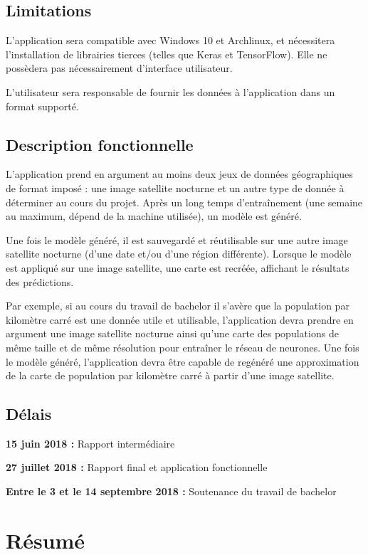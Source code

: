 \documentclass[a4paper]{report}
\begin{document}
\section{Limitations}
L'application sera compatible avec Windows 10 et Archlinux, et nécessitera l'installation de librairies tierces (telles que Keras et TensorFlow).
Elle ne possèdera pas nécessairement d'interface utilisateur.

L'utilisateur sera responsable de fournir les données à l'application dans un format supporté.

\section{Description fonctionnelle}
L'application prend en argument au moins deux jeux de données géographiques de format imposé : une image satellite nocturne et un autre type de donnée à déterminer au cours du projet. Après un long temps d'entraînement (une semaine au maximum, dépend de la machine utilisée), un modèle est généré.

Une fois le modèle généré, il est sauvegardé et réutilisable sur une autre image satellite nocturne (d'une date et/ou d'une région différente). Lorsque le modèle est appliqué sur une image satellite, une carte est recréée, affichant le résultats des prédictions.

Par exemple, si au cours du travail de bachelor il s'avère que la population par kilomètre carré est une donnée utile et utilisable, l'application devra prendre en argument une image satellite nocturne ainsi qu'une carte des populations de même taille et de même résolution pour entraîner le réseau de neurones. Une fois le modèle généré, l'application devra être capable de regénéré une approximation de la carte de population par kilomètre carré à partir d'une image satellite.

\section{Délais}
\textbf{15 juin 2018 :} Rapport intermédiaire

\textbf{27 juillet 2018 :} Rapport final et application fonctionnelle

\textbf{Entre le 3 et le 14 septembre 2018 :} Soutenance du travail de bachelor
\tableofcontents


\chapter{Résumé}
\end{document}
